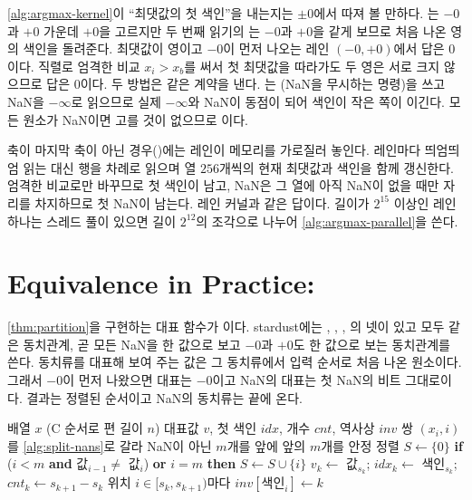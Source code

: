 \cref{alg:argmax-kernel}이 ``최댓값의 첫 색인''을 내는지는 $\pm0$에서 따져 볼 만하다. 는 $-0$과 $+0$ 가운데 $+0$을 고르지만 두 번째 읽기의 \code{==}는 $-0$과 $+0$을 같게 보므로 처음 나온 영의 색인을 돌려준다. 최댓값이 영이고 $-0$이 먼저 나오는 레인 $(-0,+0)$에서 답은 $0$이다. 직렬로 엄격한 비교 $x_i>x_b$를 써서 첫 최댓값을 따라가도 두 영은 서로 크지 않으므로 답은 $0$이다. 두 방법은 같은 계약을 낸다. 는 (NaN을 무시하는 명령)을 쓰고 NaN을 $-\infty$로 읽으므로 실제 $-\infty$와 NaN이 동점이 되어 색인이 작은 쪽이 이긴다. 모든 원소가 NaN이면 고를 것이 없으므로 이다.

축이 마지막 축이 아닌 경우()에는 레인이 메모리를 가로질러 놓인다. 레인마다 띄엄띄엄 읽는 대신 행을 차례로 읽으며 열 $256$개씩의 현재 최댓값과 색인을 함께 갱신한다. 엄격한 비교로만 바꾸므로 첫 색인이 남고, NaN은 그 열에 아직 NaN이 없을 때만 자리를 차지하므로 첫 NaN이 남는다. 레인 커널과 같은 답이다. 길이가 $2^{15}$ 이상인 레인 하나는 스레드 풀이 있으면 길이 $2^{12}$의 조각으로 나누어 \cref{alg:argmax-parallel}을 쓴다.

\section{Equivalence in Practice: \texorpdfstring{}{unique}}
\label{sec:unique}

\cref{thm:partition}을 구현하는 대표 함수가 이다. stardust에는 , , , 의 넷이 있고 모두 같은 동치관계, 곧 모든 NaN을 한 값으로 보고 $-0$과 $+0$도 한 값으로 보는 동치관계를 쓴다. 동치류를 대표해 보여 주는 값은 그 동치류에서 입력 순서로 처음 나온 원소이다. 그래서 $-0$이 먼저 나왔으면 대표는 $-0$이고 NaN의 대표는 첫 NaN의 비트 그대로이다. 결과는 정렬된 순서이고 NaN의 동치류는 끝에 온다.

\begin{algorithm}[htbp]
\begin{algorithmic}[1]
\Require 배열 $x$ (C 순서로 편 길이 $n$)
\Ensure 대표값 $v$, 첫 색인 $\mathit{idx}$, 개수 $\mathit{cnt}$, 역사상 $\mathit{inv}$
\State 쌍 $(x_i,i)$를 \cref{alg:split-nans}로 갈라 NaN이 아닌 $m$개를 앞에
\State 앞의 $m$개를 안정 정렬 
\State $S\gets\{0\}$ 
  \State \textbf{if} ($i<m$ \textbf{and} 값$_{i-1}\ne$ 값$_i$) \textbf{or} $i=m$ \textbf{then} $S\gets S\cup\{i\}$ 
\EndFor
\ForAll{동치류 $k$: 정렬 위치 $[s_k,s_{k+1})$ ($s_K=n$; $n=0$이면 빈 결과)}
  \State $v_k\gets$ 값$_{s_k}$; $\mathit{idx}_k\gets$ 색인$_{s_k}$; $\mathit{cnt}_k\gets s_{k+1}-s_k$
  \State 위치 $i\in[s_k,s_{k+1})$마다 $\mathit{inv}[\text{색인}_i]\gets k$
\EndFor
\end{algorithmic}
\caption{정렬로 구하는 unique (stardust )}
\label{alg:unique}
\end{algorithm}

